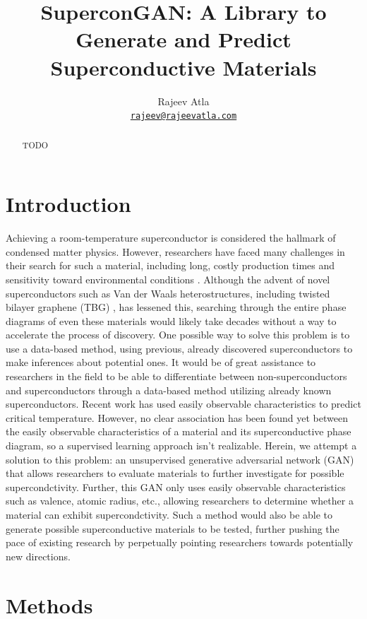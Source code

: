 \documentclass[11pt]{article}
\title{SuperconGAN: A Library to Generate and Predict Superconductive Materials}
\author{
    Rajeev Atla\\
    \texttt{\href{mailto:rajeev@rajeevatla.com}{rajeev@rajeevatla.com}}
}
\date{}
\begin{document}
\maketitle

\begin{abstract}
TODO
\end{abstract}

\section{Introduction}

Achieving a room-temperature superconductor is considered the hallmark of condensed matter physics.
However, researchers have faced many challenges in their search for such a material, including long, costly production times and sensitivity toward environmental conditions \cite{blank1988} \cite{zaki_saleem_anwar_2013}.
Although the advent of novel superconductors such as Van der Waals heterostructures, including twisted bilayer graphene (TBG) \cite{tbg_2018}, has lessened this, searching through the entire phase diagrams of even these materials would likely take decades without a way to accelerate the process of discovery.
One possible way to solve this problem is to use a data-based method, using previous, already discovered superconductors to make inferences about potential ones.
It would be of great assistance to researchers in the field to be able to differentiate between non-superconductors and superconductors through a data-based method utilizing already known superconductors.
Recent work \cite{hamidieh2018} has used easily observable characteristics to predict critical temperature.
However, no clear association has been found yet between the easily observable characteristics of a material and its superconductive phase diagram, so a supervised learning approach isn't realizable.
Herein, we attempt a solution to this problem: an unsupervised generative adversarial network (GAN) that allows researchers to evaluate materials to further investigate for possible supercondctivity.
Further, this GAN only uses easily observable characteristics such as valence, atomic radius, etc., allowing researchers to determine whether a material can exhibit supercondctivity. 
Such a method would also be able to generate possible superconductive materials to be tested, further pushing the pace of existing research by perpetually pointing researchers towards potentially new directions.

\section{Methods}
\end{document}
